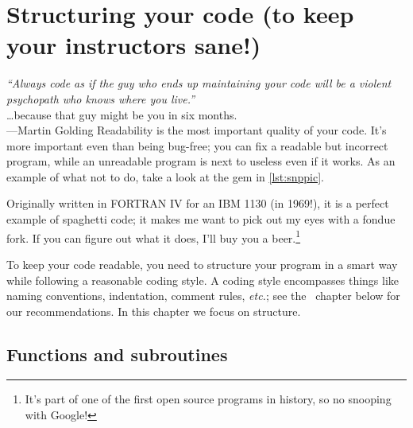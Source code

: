 \documentclass[openany,oneside]{report}
\renewenvironment{quote}{\list{}{\leftmargin=8\parindent}\item\relax}{\endlist}
\begin{document}
\chapter[Structuring your code]{Structuring your code (to keep your instructors sane!)}
\label{chap:Structure}

\begin{quote}\small
  \emph{``Always code as if the guy who ends up maintaining your code will be a violent psychopath who knows where you live.''} \\ \ldots because that guy might be you in six months. \\ \hspace*{\fill}---Martin Golding
\end{quote}
Readability is the most important quality of your code.
It's more important even than being bug-free; you can fix a readable but incorrect program, while an unreadable program is next to useless even if it works.
As an example of what not to do, take a look at the gem in \autoref{lst:snppic}.

Originally written in FORTRAN IV for an IBM 1130 (in 1969!), it is a perfect example of spaghetti code; it makes me want to pick out my eyes with a fondue fork.
If you can figure out what it does, I'll buy you a beer.\footnote{It's part of one of the first open source programs in history, so no snooping with Google!}

To keep your code readable, you need to structure your program in a smart way while following a reasonable coding style.
A coding style encompasses things like naming conventions, indentation, comment rules, \emph{etc.}; see the ~chapter below for our recommendations.
In this chapter we focus on structure.

\section{Functions and subroutines}
\end{document}
